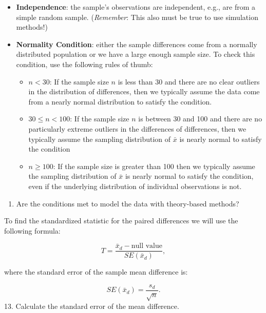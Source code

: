 \documentclass[
]{report}
\providecommand{\tightlist}{%
  \setlength{\itemsep}{0pt}\setlength{\parskip}{0pt}}
\begin{document}
\begin{itemize}
\item
  \textbf{Independence}: the sample's observations are independent, e.g., are from a simple random sample. (\emph{Remember}: This also must be true to use simulation methods!)
\item
  \textbf{Normality Condition}: either the sample differences come from a normally distributed population or we have a large enough sample size. To check this condition, use the following rules of thumb:

  \begin{itemize}
  \item
    \(n < 30\): If the sample size \(n\) is less than 30 and there are no clear outliers in the distribution of differences, then we typically assume the data come from a nearly normal distribution to satisfy the condition.
  \item
    \(30 \le n < 100\): If the sample size \(n\) is between 30 and 100 and there are no particularly extreme outliers in the differences of differences, then we typically assume the sampling distribution of \(\bar{x}\) is nearly normal to satisfy the condition
  \item
    \(n \ge 100\): If the sample size is greater than 100 then we typically assume the sampling distribution of \(\bar{x}\) is nearly normal to satisfy the condition, even if the underlying distribution of individual observations is not.
  \end{itemize}
\end{itemize}

\begin{enumerate}
\def\labelenumi{\arabic{enumi}.}
\setcounter{enumi}{11}
\tightlist
\item
  Are the conditions met to model the data with theory-based methods?
\end{enumerate}

\vspace{0.8in}

To find the standardized statistic for the paired differences we will use the following formula:

\[T = \frac{\bar{x}_d - \text{null value}}{SE(\bar{x}_d)},\]

where the standard error of the sample mean difference is:

\[SE(\bar{x}_d)=\frac{s_d}{\sqrt{n}}.\]
13. Calculate the standard error of the mean difference.

\vspace{0.6in}
\end{document}
